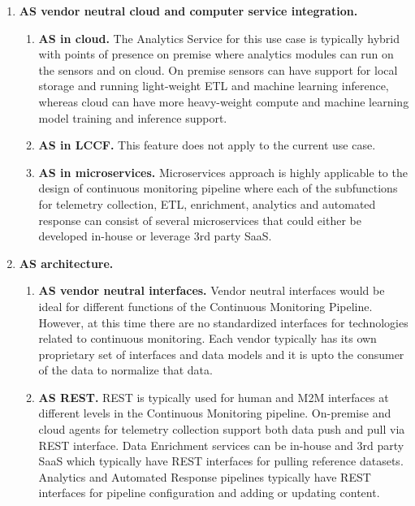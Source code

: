 \begin{enumerate}

\item{\bf AS vendor neutral cloud and computer service integration.}

  \begin{enumerate}
  
  \item {\bf AS in cloud.} The Analytics Service for this use case is typically hybrid with points of presence on premise where analytics modules can run on the sensors and on cloud. On premise sensors can have support for local storage and running light-weight ETL and machine learning inference, whereas cloud can have more heavy-weight compute and machine learning model training and inference support.
  
  \item {\bf AS in LCCF.} This feature does not apply to the current use case.
  
  \item {\bf AS in microservices.} Microservices approach is highly applicable to the design of continuous monitoring pipeline where each of the subfunctions for telemetry collection, ETL, enrichment, analytics and automated response can consist of several microservices that could either be developed in-house or leverage 3rd party SaaS.
  
  \end{enumerate}

\item{\bf AS architecture.}

  \begin{enumerate}
  
  \item{\bf AS vendor neutral interfaces.} Vendor neutral interfaces would be ideal for different functions of the Continuous Monitoring Pipeline. However, at this time there are no standardized interfaces for technologies related to continuous monitoring. Each vendor typically has its own proprietary set of interfaces and data models and it is upto the consumer of the data to normalize that data.
  
  \item{\bf AS REST.} REST is typically used for human and M2M interfaces at different levels in the Continuous Monitoring pipeline. On-premise and cloud agents for telemetry collection support both data push and pull via REST interface. Data Enrichment services can be in-house and 3rd party SaaS which typically have REST interfaces for pulling reference datasets. Analytics and Automated Response pipelines typically have REST interfaces for pipeline configuration and adding or updating content.
  

\end{enumerate}
\end{enumerate}
